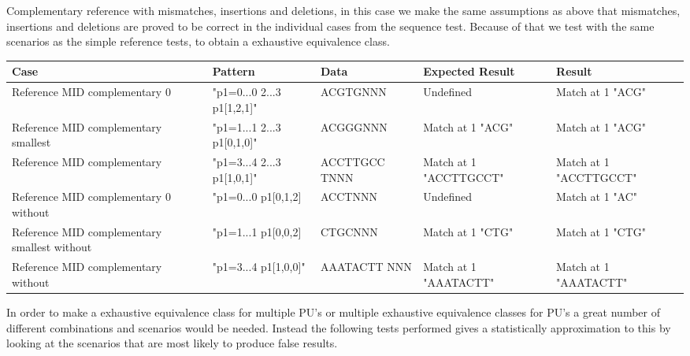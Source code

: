 \documentclass[12pt]{article}
\newcommand{\textapprox}{\raisebox{0.5ex}{\texttildelow}}
\newcommand{\pus}{PU's }
\begin{document}
Complementary reference with mismatches, insertions and deletions, in this case we make the same assumptions as above
that mismatches, insertions and deletions are proved to be correct in the individual cases from the sequence test.
Because of that we test with the same scenarios as the simple reference tests, to obtain a exhaustive equivalence class.
\begin{table}[H]
\begin{tabular}{p{4cm}|p{3cm}|p{2.5cm}|p{2.5cm}|p{2.5cm}}
Case 			& Pattern & Data & Expected Result & Result \\ \hline
\rowcolor{lightred}
Reference MID complementary 0 & "p1=0...0 2...3 \textapprox p1[1,2,1]" & ACGTGNNN & Undefined & Match at 1 "ACG" \\ \hline
\rowcolor{lightgreen}
Reference MID complementary smallest & "p1=1...1 2...3 \textapprox p1[0,1,0]" & ACGGGNNN & Match at 1 "ACG" & Match at 1 "ACG" \\ \hline
\rowcolor{lightgreen}
Reference MID complementary & "p1=3...4 2...3 \textapprox p1[1,0,1]" & ACCTTGCC TNNN & Match at 1 "ACCTTGCCT" & Match at 1 "ACCTTGCCT" \\ \hline
\rowcolor{lightred}
Reference MID complementary 0 without & "p1=0...0 \textapprox p1[0,1,2] & ACCTNNN & Undefined & Match at 1 "AC" \\ \hline 
\rowcolor{lightgreen}
Reference MID complementary smallest without & "p1=1...1 \textapprox p1[0,0,2] & CTGCNNN & Match at 1 "CTG" & Match at 1 "CTG" \\ \hline
\rowcolor{lightgreen}
Reference MID complementary without & "p1=3...4 \textapprox p1[1,0,0]" & AAATACTT NNN & Match at 1 "AAATACTT" & Match at 1 "AAATACTT" \\ \hline
\end{tabular}
\end{table}


In order to make a exhaustive equivalence class for multiple \pus or multiple exhaustive equivalence classes for \pus
a great number of different combinations and scenarios would be needed. Instead the following tests performed gives a 
statistically approximation to this by looking at the scenarios that are most likely to produce false results.
\end{document}

